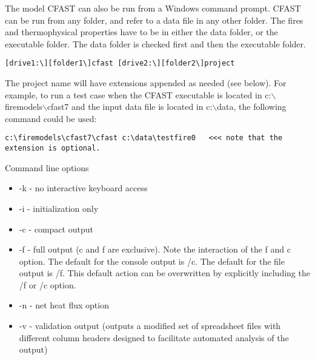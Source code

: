 The model CFAST can also be run from a Windows command prompt.  CFAST can be run from any folder, and refer to a data file in any other folder. The fires and thermophysical properties have to be in either the data folder, or the executable folder. The data folder is checked first and then the executable folder.

\begin{lstlisting}
[drive1:\][folder1\]cfast [drive2:\][folder2\]project
\end{lstlisting}

The project name will have extensions appended as needed (see below). For example, to run a test case when the CFAST executable is located in c:$\backslash$firemodels$\backslash$cfast7 and the input data file is located in c:$\backslash$data, the following command could be used:

\begin{lstlisting}
c:\firemodels\cfast7\cfast c:\data\testfire0   <<< note that the extension is optional.
\end{lstlisting}

Command line options

\begin{itemize}
\item -k - no interactive keyboard access
\item -i - initialization only
\item -c - compact output
\item -f - full output (c and f are exclusive). Note the interaction of the f and c option. The default for the console output is /c. The default for the file output is /f. This default action can be overwritten by explicitly including the /f or /c option.
\item -n - net heat flux option
\item -v - validation output (outputs a modified set of spreadsheet files with different column headers designed to facilitate automated analysis of the output)
\end{itemize}


\label{last_page}





